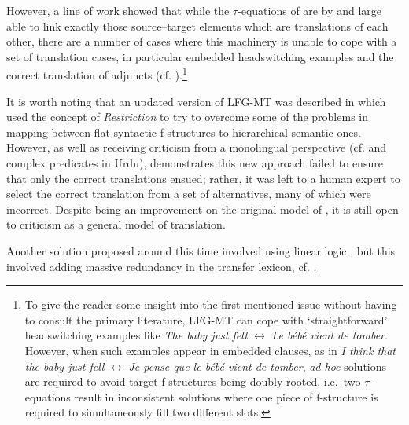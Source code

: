 \documentclass[output=paper,hidelinks]{langscibook}
\begin{document}
However, a line of work showed that while the $\tau$-equations of \citet{kaplanetal1989} are by and large able to link exactly those source--target elements which are translations of each other, there are a number of cases where this machinery is unable to cope with a set of translation cases, in particular embedded headswitching examples and the correct translation of adjuncts (cf. \citealt{ASCW90,ST91,Way01}).\footnote{\label{fn:GrammarInduction:7}To give the reader some insight into the first-mentioned issue without having to consult the primary literature, LFG-MT can cope with `straightforward' headswitching examples like {\em The baby just fell} $\longleftrightarrow$ {\em Le b\'{e}b\'{e} vient de tomber}. However, when such examples appear in embedded clauses, as in {\em I think that the baby just fell} $\longleftrightarrow$ {\em Je pense que le b\'{e}b\'{e} vient de tomber}, {\em ad hoc} solutions are required to avoid target f-structures being doubly rooted, i.e.\ two $\tau$-equations result in inconsistent solutions where one piece of f-structure is required to simultaneously fill two different slots.}

It is worth noting that an updated version of LFG-MT was described in \citet{kaplanwedekind93} which used the concept of {\em Restriction} to try to overcome some of the problems in mapping between flat syntactic f-structures to
hierarchical semantic ones. However, as well as receiving criticism from a monolingual perspective (cf. \citet{Butt1994} and complex predicates in Urdu), \citet{Way01} demonstrates this new approach failed to ensure that only the correct translations ensued; rather, it was left to a human expert to select the correct translation from a set of alternatives, many of which were incorrect. Despite being an improvement on the original model of \citet{kaplanetal1989}, it is still open to criticism as a general model of translation.

Another solution proposed around this time involved using linear logic \citep{vanGetal:98}, but this involved adding massive redundancy in the transfer lexicon, cf. \citet[92--96]{Way01}.
\end{document}
